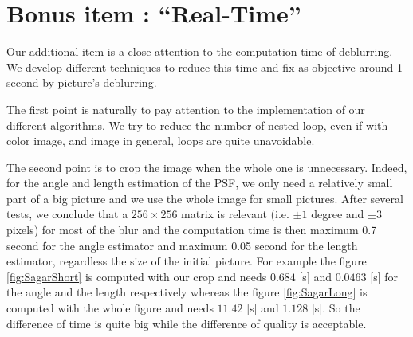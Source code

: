 
\section{Bonus item : ``Real-Time''}

Our additional item is a close attention to the computation time of deblurring.
We develop different techniques to reduce this time and fix as objective around 1 second by picture's deblurring.

The first point is naturally to pay attention to the implementation of our different algorithms. We try to reduce the number of nested loop, even if with color image, and image in general, loops are quite unavoidable.

The second point is to crop the image when the whole one is unnecessary. Indeed, for the angle and length estimation of the PSF, we only need a relatively small part of a big picture and we  use the whole image for small pictures. After several tests, we conclude that a $256 \times 256 $ matrix is relevant (i.e. $\pm 1$ degree and $\pm 3$ pixels) for most of the blur and the computation time is then maximum 0.7 second for the angle estimator and maximum 0.05 second for the length estimator, regardless the size of the initial picture. For example the figure \ref{fig:SagarShort} is computed with our crop and needs $0.684 $ [s] and $0.0463$ [s] for the angle and the length respectively whereas the figure \ref{fig:SagarLong} is computed with the whole figure and needs $11.42$ [s] and $1.128$ [s]. So the difference of time is quite big while the difference of quality is acceptable. 

